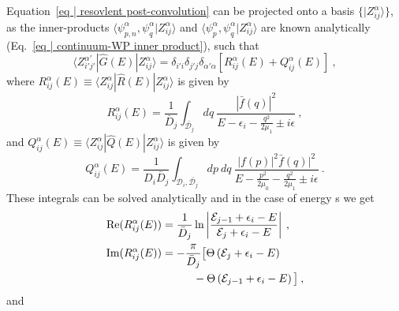 \documentclass[aps,prc,showpacs,twocolumn,floatfix,nobibnotes,nofootinbib,amsmath,amssymb,longbibliography]{revtex4-2}
\begin{document}
Equation~\eqref{eq | resovlent post-convolution} can be projected onto
a \swp{} basis $\{|Z_{ij}^\alpha\rangle\}$, as the
inner-products $\langle \psi_{p,n}^\alpha,
\psi_q^\alpha|Z_{ij}^\alpha\rangle$ and $\langle \psi_p^\alpha,
\psi_q^\alpha|Z_{ij}^\alpha\rangle$ are known analytically
(Eq.~\eqref{eq | continuum-WP inner product}), such
that 
\begin{equation}
	\langle Z_{i'j'}^{\alpha'}|\hat{G}(E)|Z_{ij}^{\alpha}\rangle = \delta_{i'i}\delta_{j'j}\delta_{\alpha'\alpha}\left[R_{ij}^\alpha(E) + Q_{ij}^\alpha(E)\right] \:,
\end{equation}
where $R_{ij}^\alpha(E)\equiv\langle Z_{ij}^{\alpha}|\hat{R}(E)|Z_{ij}^{\alpha}\rangle$ is given by
\begin{equation}
	R_{ij}^\alpha(E) = \frac{1}{\bar{D}_j}\int_{\bar{\mathcal{D}_j}}dq\:\frac{|\bar{f}(q)|^2}{E - \epsilon_i - \frac{q^2}{2\mu_1} \pm i\epsilon}\:,
\end{equation}
and $Q_{ij}^\alpha(E)\equiv\langle Z_{ij}^{\alpha}|\hat{Q}(E)|Z_{ij}^{\alpha}\rangle$ is given by
\begin{equation}
	Q_{ij}^\alpha(E) = \frac{1}{D_i\bar{D}_j}\int_{\mathcal{D}_i, \bar{\mathcal{D}_j}}dp\:dq\:\frac{|f(p)|^2\bar{f}(q)|^2}{E - \frac{p^2}{2\mu_0} - \frac{q^2}{2\mu_1} \pm i\epsilon}\:.
\end{equation}
These integrals can be solved analytically and in the case of energy \swp{}s we get
\begin{align}
	\begin{split}
	\text{Re}(R_{ij}^\alpha(E)) &= \frac{1}{\bar{D}_j}\ln\left|\frac{\mathcal{E}_{j-1}+\epsilon_i - E}{\mathcal{E}_j + \epsilon_i - E}\right| \:,\\
	\text{Im}(R_{ij}^\alpha(E)) &= -\frac{\pi}{\bar{D}_j}\big[\Theta\left(\mathcal{E}_j+\epsilon_i-E\right) \\
	&\hspace{1.cm}- \Theta\left(\mathcal{E}_{j-1}+\epsilon_i-E\right)\big] \:,
	\end{split}
\end{align}
and
\end{document}

